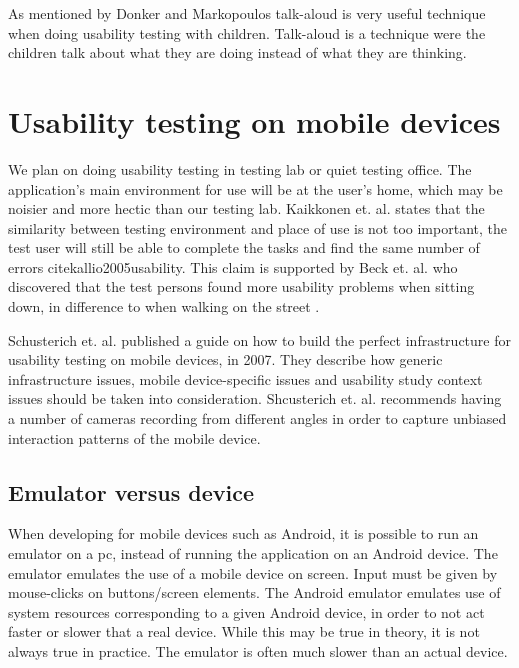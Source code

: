 As mentioned by Donker and Markopoulos \cite{TalkAloud} talk-aloud is very useful technique when doing usability testing with children. Talk-aloud is a technique were the children talk about what they are doing instead of what they are thinking.


\section{Usability testing on mobile devices}
\label{sec:usabilitytestonmobiledevices}
We plan on doing usability testing in testing lab or quiet testing office. The application's main environment for use will be at the user's home, which may be noisier and more hectic than our testing lab. Kaikkonen et. al. states that the similarity between testing environment and place of use is not too important, the test user will still be able to complete the tasks and find the same number of errors cite{kallio2005usability}. This claim is supported by Beck et. al. who discovered that the test persons found more usability problems when sitting down, in difference to when walking on the street \cite{beck2003experimental}. 

Schusterich et. al. \cite{schusteritsch2007towards} published a guide on how to build the perfect infrastructure for usability testing on mobile devices, in 2007. They describe how generic infrastructure issues, mobile device-specific issues and usability study context issues should be taken into consideration. Shcusterich et. al. recommends having a number of cameras recording from different angles in order to capture unbiased interaction patterns of the mobile device. 

\subsection{Emulator versus device}
When developing for mobile devices such as Android, it is possible to run an emulator on a pc, instead of running the application on an Android device. The emulator emulates the use of a mobile device on screen. Input must be given by mouse-clicks on buttons/screen elements. The Android emulator emulates use of system resources corresponding to a given Android device, in order to not act faster or slower that a real device. While this may be true in theory, it is not always true in practice. The emulator is often much slower than an actual device.


